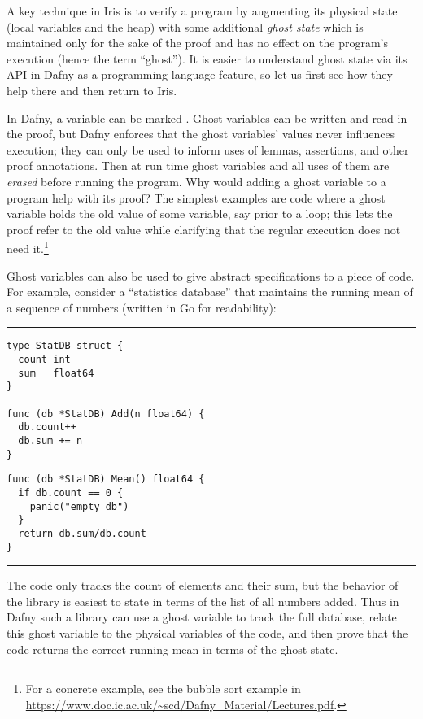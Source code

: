 A key technique in Iris is to verify a program by augmenting its
physical state (local variables and the heap) with some additional \emph{ghost
state} which is maintained only for the sake of the proof and has no effect on
the program's execution (hence the term ``ghost''). It is easier to understand
ghost state via its API in Dafny as a programming-language feature, so let
us first see how they help there and then return to Iris.

In Dafny, a variable can be marked . Ghost variables can be written
and read in the proof, but Dafny enforces that the ghost variables' values never
influences execution; they can only be used to inform uses of lemmas,
assertions, and other proof annotations. Then at run time ghost variables and all
uses of them are \emph{erased} before running the program. Why would adding a
ghost variable to a program help with its proof? The simplest examples are code
where a ghost variable holds the old value of some variable, say prior to a
loop; this lets the proof refer to the old value while clarifying that the
regular execution does not need it.\footnote{For a concrete example, see the
bubble sort example in
\url{https://www.doc.ic.ac.uk/~scd/Dafny_Material/Lectures.pdf}.}

Ghost variables can also be used to give abstract specifications to a piece of
code. For example, consider a ``statistics database'' that maintains the running
mean of a sequence of numbers (written in Go for readability):

\vspace{\baselineskip}
\hrule
\vspace{-8pt}
\begin{multicols}{2}
\begin{verbatim}
type StatDB struct {
  count int
  sum   float64
}

func (db *StatDB) Add(n float64) {
  db.count++
  db.sum += n
}
\end{verbatim}
%
\columnbreak

\begin{verbatim}
func (db *StatDB) Mean() float64 {
  if db.count == 0 {
    panic("empty db")
  }
  return db.sum/db.count
}
\end{verbatim}
\end{multicols}
\vspace{-5pt}
\hrule
\vspace{\baselineskip}

The code only tracks the count of elements and
their sum, but the behavior of the library is easiest to state in terms of the list of all
numbers added. Thus in Dafny such a library can use a ghost variable to track
the full database, relate this ghost variable to the physical variables
of the code, and then prove that the code returns the correct running mean in
terms of the ghost state.

